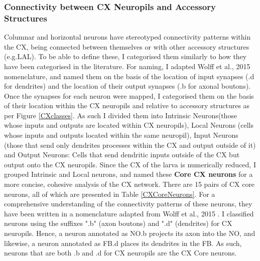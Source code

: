     \subsubsection{Connectivity between CX Neuropils and Accessory Structures}
    Columnar and horizontal neurons have stereotyped connectivity patterns within the CX, being connected between themselves or with other accessory structures (e.g.LAL). To be able to define these, I categorised them similarly to how they have been categorised in the literature. For naming, I adapted Wolff et al., 2015 nomenclature, and named them on the basis of the location of input synapses (.d for dendrites) and the location of their output synapses (.b for axonal boutons). Once the synapses for each neuron were mapped, I categorised them on the basis of their location within the CX neuropils and relative to accessory structures as per Figure \ref{CXclasses}.  As such I divided them into Intrinsic Neurons(those whose inputs and outputs are located within CX neuropils), Local Neurons (cells whose inputs and outputs located within the same neuropil), Input Neurons (those that send only dendrites processes within the CX and output outside of it) and Output Neurons: Cells that send dendritic inputs outside of the CX but output onto the CX neuropils. Since the CX of the larva is numerically reduced, I grouped Intrinsic and Local neurons, and named these \textbf{Core CX neurons} for a more concise, cohesive analysis of the CX network. There are 15 pairs of CX core neurons, all of which are presented in Table \ref{CXCoreNeurons}. For a comprehensive understanding of the connectivity patterns of these neurons, they have been written in a nomenclature adapted from Wolff et al., 2015 \citep{wolff2015neuroarchitecture}. I classified neurons using the suffixes ".b" (axon boutons) and ".d" (dendrites) for CX neuropils.
    Hence, a neuron annotated as NO.b projects its axon into the NO, and likewise, a neuron annotated as FB.d places its dendrites in the FB.
    As such, neurons that are both .b and .d for CX neuropils are the CX Core neurons. 
